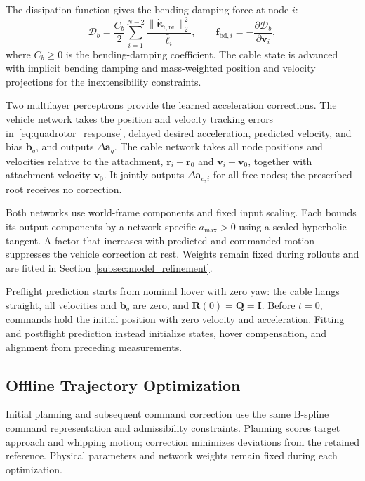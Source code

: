 \documentclass[letterpaper, 10 pt, conference]{ieeeconf}
\begin{document}
The dissipation function gives the bending-damping force at node $i$:
\begin{equation}
\mathcal D_b=\frac{C_b}{2}
\sum_{i=1}^{N-2}\frac{\|\dot{\boldsymbol\kappa}_{i,\mathrm{rel}}\|_2^2}{\bar\ell_i},
\qquad
\mathbf f_{\mathrm{bd},i}=-\frac{\partial\mathcal D_b}{\partial\mathbf v_i},
\label{eq:bending_damping}
\end{equation}
where $C_b\geq0$ is the bending-damping coefficient.
The cable state is advanced with implicit bending damping and
mass-weighted position and velocity projections for the
inextensibility constraints.

Two multilayer perceptrons provide the learned acceleration
corrections. The vehicle network takes the position and velocity
tracking errors in~\eqref{eq:quadrotor_response}, delayed desired
acceleration, predicted velocity, and bias $\mathbf b_q$,
and outputs $\Delta\mathbf a_q$.
The cable network takes all node positions and velocities
relative to the attachment,
$\mathbf r_i-\mathbf r_0$ and $\mathbf v_i-\mathbf v_0$,
together with attachment velocity $\mathbf v_0$.
It jointly outputs $\Delta\mathbf a_{c,i}$ for all free nodes;
the prescribed root receives no correction.

Both networks use world-frame components and fixed input scaling.
Each bounds its output components by a network-specific
$a_{\max}>0$ using a scaled hyperbolic tangent. A factor that
increases with predicted and commanded motion suppresses the
vehicle correction at rest. Weights remain fixed during rollouts
and are fitted in Section~\ref{subsec:model_refinement}.

Preflight prediction starts from nominal hover with zero yaw:
the cable hangs
straight, all velocities and $\mathbf b_q$ are zero, and
$\mathbf R(0)=\mathbf Q=\mathbf I$. Before $t=0$, commands hold
the initial position with zero velocity and acceleration.
Fitting and postflight prediction instead initialize states,
hover compensation, and alignment from preceding measurements.

\subsection{Offline Trajectory Optimization}
\label{subsec:offline_planning}

Initial planning and subsequent command correction use the same
B-spline command representation and admissibility constraints.
Planning scores target approach and whipping motion; correction
minimizes deviations from the retained reference. Physical
parameters and network weights remain fixed during each
optimization.
\end{document}
